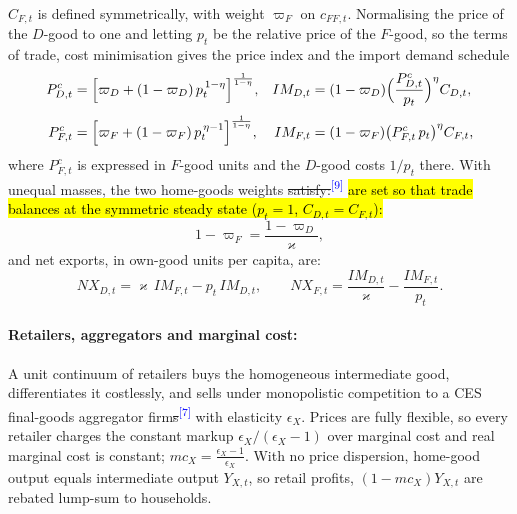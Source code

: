 \documentclass[11pt]{article}
\newcommand{\A}[1]{\hl{#1}}
\newcommand{\D}[1]{{\color{red}\st{#1}}}
\newcommand{\chg}[1]{\textsuperscript{\textcolor{blue}{\scriptsize[#1]}}}
\begin{document}
$C_{F,t}$ is defined
symmetrically, with weight $\varpi_F$ on $c_{FF,t}$. Normalising the price of the
$D$-good to one and letting $p_t$ be the relative price of the $F$-good, so the terms of trade, cost
minimisation gives the price index and the import demand schedule
\begin{align}
P^{c}_{D,t}&=\Bigl[\varpi_D+(1-\varpi_D)\,p_t^{\,1-\eta}\Bigr]^{\frac{1}{1-\eta}},
&
IM_{D,t}&=(1-\varpi_D)\Bigl(\frac{P^{c}_{D,t}}{p_t}\Bigr)^{\eta}C_{D,t},
\label{eq:ces-D}\\[3pt]
P^{c}_{F,t}&=\Bigl[\varpi_F+(1-\varpi_F)\,p_t^{\,\eta-1}\Bigr]^{\frac{1}{1-\eta}},
&
IM_{F,t}&=(1-\varpi_F)\bigl(P^{c}_{F,t}\,p_t\bigr)^{\eta}C_{F,t},
\label{eq:ces-F}
\end{align}
where $P^{c}_{F,t}$ is expressed in $F$-good units and the $D$-good costs $1/p_t$
there. With unequal masses, the two home-goods weights \D{satisfy:}\chg{9} \A{are set so that trade balances at the symmetric steady state ($p_t=1$, $C_{D,t}=C_{F,t}$):}
\begin{equation}
1-\varpi_F=\frac{1-\varpi_D}{\varkappa},
\label{eq:home-bias-size}
\end{equation}
and net exports, in own-good units per capita, are:
\begin{equation}
NX_{D,t}=\varkappa\,IM_{F,t}-p_t\,IM_{D,t},
\qquad
NX_{F,t}=\frac{IM_{D,t}}{\varkappa}-\frac{IM_{F,t}}{p_t}.
\label{eq:nx}
\end{equation}

\paragraph{Retailers, aggregators and marginal cost:}
A unit continuum of retailers buys the homogeneous intermediate good, differentiates it costlessly, and sells under monopolistic competition to a CES final-goods aggregator firm\D{s}\chg{7} with elasticity $\epsilon_X$. Prices are fully flexible, so every retailer charges the constant markup $\epsilon_X/(\epsilon_X-1)$ over marginal cost and real marginal cost is constant; $mc_X=\frac{\epsilon_X-1}{\epsilon_X}$. With no price dispersion, home-good output equals intermediate output $Y_{X,t}$, so retail profits, $(1-mc_X)Y_{X,t}$ are rebated lump-sum to households.
\end{document}
